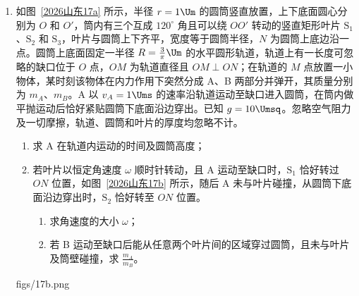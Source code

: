 \documentclass[\gkver]{gaokaozhenti}
\begin{document}
\begin{enumerate}
{\begin{enumerate}
	\item
	$a = \frac{2\mu BEL}{3mr}$

\end{enumerate}
}

\item
如图~\ref{2026山东17a} 所示，半径 $r = 1\Um$ 的圆筒竖直放置，上下底面圆心分别为 $O$ 和 $O'$，筒内有三个互成 $120^{\circ}$ 角且可以绕 $OO'$ 转动的竖直矩形叶片 $\text{S}_{1}$、$\text{S}_{2}$ 和 $\text{S}_{3}$，叶片与圆筒上下齐平，宽度等于圆筒半径，$N$ 为圆筒上底边沿一点。圆筒上底面固定一半径 $R = \frac{3}{\pi}\Um$ 的水平圆形轨道，轨道上有一长度可忽略的缺口位于 $O$ 点，$OM$ 为轨道直径且 $OM \perp ON$；在轨道的 $M$ 点放置一小物体，某时刻该物体在内力作用下突然分成 A、B 两部分并弹开，其质量分别为 $m_{A}$、$m_{B}$。A 以 $v_{A} = 1\Ums$ 的速率沿轨道运动至缺口进入圆筒，在筒内做平抛运动后恰好紧贴圆筒下底面沿边穿出。已知 $g = 10\Umsq$。忽略空气阻力及一切摩擦，轨道、圆筒和叶片的厚度均忽略不计。
\begin{enumerate}
	\item
	求 A 在轨道内运动的时间及圆筒高度；
	\item
	若叶片以恒定角速度 $\omega$ 顺时针转动，且 A 运动至缺口时，$\text{S}_{1}$ 恰好转过 $ON$ 位置，如图~\ref{2026山东17b} 所示，随后 A 未与叶片碰撞，从圆筒下底面沿边穿出时，$\text{S}_{2}$ 恰好转至 $ON$ 位置。
	\begin{enumerate}
		\item
		求角速度的大小 $\omega$；
		\item
		若 B 运动至缺口后能从任意两个叶片间的区域穿过圆筒，且未与叶片及筒壁碰撞，求 $\frac{m_{A}}{m_{B}}$。
	\end{enumerate}
\end{enumerate}
{figs/17b.png}
\end{enumerate}
\end{document}
